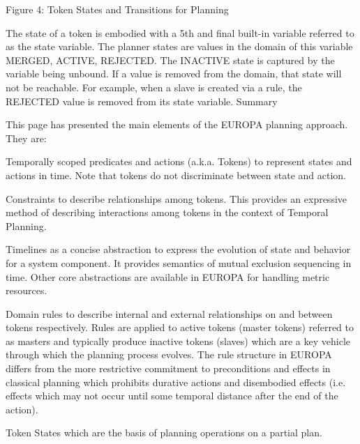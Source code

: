 Figure 4: Token States and Transitions for Planning

The state of a token is embodied with a 5th and final built-in
variable referred to as the state variable. The planner states are
values in the domain of this variable {MERGED, ACTIVE, REJECTED}. The
INACTIVE state is captured by the variable being unbound. If a value
is removed from the domain, that state will not be reachable. For
example, when a slave is created via a rule, the REJECTED value is
removed from its state variable.  Summary

This page has presented the main elements of the EUROPA planning approach. They are:

Temporally scoped predicates and actions (a.k.a. Tokens) to represent
states and actions in time. Note that tokens do not discriminate
between state and action.

Constraints to describe relationships among tokens. This provides an
expressive method of describing interactions among tokens in the
context of Temporal Planning.

Timelines as a concise abstraction to express the evolution of state
and behavior for a system component. It provides semantics of mutual
exclusion sequencing in time. Other core abstractions are available in
EUROPA for handling metric resources.

Domain rules to describe internal and external relationships on and
between tokens respectively. Rules are applied to active tokens
(master tokens) referred to as masters and typically produce inactive
tokens (slaves) which are a key vehicle through which the planning
process evolves. The rule structure in EUROPA differs from the more
restrictive commitment to preconditions and effects in classical
planning which prohibits durative actions and disembodied effects
(i.e. effects which may not occur until some temporal distance after
the end of the action).

Token States which are the basis of planning operations on a partial
plan.
